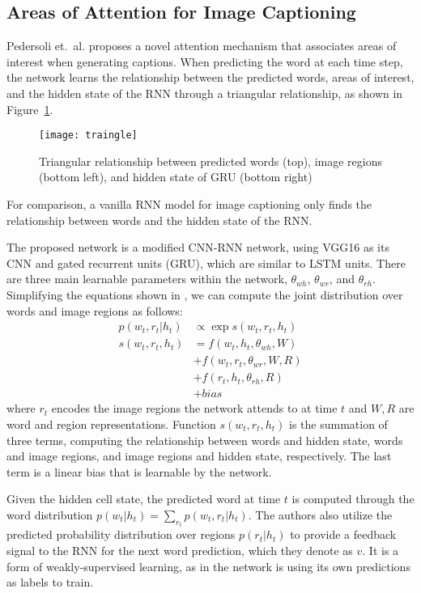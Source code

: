 \documentclass[12pt,onecolumn,letterpaper,draftclsnofoot]{article}
\newcommand{\figref}[1]{Figure~\ref{fig:#1}}
\begin{document}
\subsection{Areas of Attention for Image Captioning}

Pedersoli et.\ al.\cite{attentionwhere} proposes a novel attention mechanism
that associates areas of interest when generating captions. When predicting
the word at each time step, the network learns the relationship between the
predicted words, areas of interest, and the hidden state of the RNN through a
triangular relationship, as shown in \figref{triangle}.
%
\begin{figure}
  \centering
  \texttt{[image: traingle]}
  \caption{Triangular relationship between predicted words (top), image
  regions (bottom left), and hidden state of GRU (bottom right)}
  \label{fig:triangle}
\end{figure}
%
For comparison, a vanilla RNN model for image captioning only finds the
relationship between words and the hidden state of the RNN.
  
The proposed network is a modified CNN-RNN network, using VGG16 as its CNN and
gated recurrent units (GRU), which are similar to LSTM units. There are three
main learnable parameters within the network, $\theta_{wh}$, $\theta_{wr}$,
and $\theta_{rh}$.  Simplifying the equations shown in \cite{attentionwhere},
we can compute the joint distribution over words and image regions as follows:
%
\begin{equation}
  \begin{aligned}
    p(w_t, r_t|h_t) &\propto \exp s(w_t, r_t, h_t) \\
    s(w_t, r_t, h_t) &= f(w_t, h_t, \theta_{wh}, W) \\
                     &+ f(w_t, r_t, \theta_{wr}, W, R) \\
                     &+ f(r_t, h_t, \theta_{rh}, R) \\
                     &+ bias
  \end{aligned}
\end{equation}
%
where $r_t$ encodes the image regions the network attends to at time $t$ and
$W,R$ are word and region representations. Function $s(w_t, r_t, h_t)$ is the
summation of three terms, computing the relationship between words and hidden
state, words and image regions, and image regions and hidden state,
respectively. The last term is a linear bias that is learnable by the network.

Given the hidden cell state, the predicted word at time $t$ is computed
through the word distribution $p(w_t|h_t) = \sum_{r_t} p(w_t,r_t|h_t)$. The
authors also utilize the predicted probability distribution over regions
$p(r_t|h_t)$ to provide a feedback signal to the RNN for the next word
prediction, which they denote as $v$. It is a form of weakly-supervised
learning, as in the network is using its own predictions as labels to train.
\end{document}
